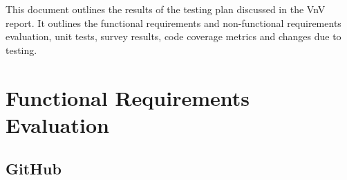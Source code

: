 \documentclass[12pt, titlepage]{article}
\begin{document}
	\listoffigures %
	
	\newpage
	
	
	This document outlines the results of the testing plan discussed in the VnV report. It outlines the functional requirements and non-functional requirements evaluation, unit tests, survey results, code coverage metrics and changes due to testing.
	
	\section{Functional Requirements Evaluation}
	
	\subsection{GitHub}
\end{document}
